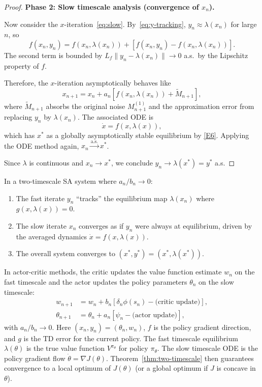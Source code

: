 \documentclass[11pt,a4paper]{article}
\theoremstyle{definition}
\theoremstyle{plain}
\theoremstyle{remark}
\newcommand{\cas}{\xrightarrow{\text{a.s.}}}
\begin{document}
\begin{proof}
\medskip
\noindent\textbf{Phase 2: Slow timescale analysis (convergence of $x_n$).}

Now consider the $x$-iteration~\eqref{eq:slow}. By~\eqref{eq:y-tracking},
$y_n \approx \lambda(x_n)$ for large $n$, so
\[
  f(x_n, y_n) = f(x_n, \lambda(x_n)) + [f(x_n, y_n) - f(x_n, \lambda(x_n))].
\]
The second term is bounded by $L_f \|y_n - \lambda(x_n)\| \to 0$ a.s.\ by
the Lipschitz property of $f$.

Therefore, the $x$-iteration asymptotically behaves like
\[
  x_{n+1} = x_n + a_n [f(x_n, \lambda(x_n)) + \tilde{M}_{n+1}],
\]
where $\tilde{M}_{n+1}$ absorbs the original noise $M_{n+1}^{(1)}$ and the
approximation error from replacing $y_n$ by $\lambda(x_n)$. The associated ODE is
\[
  \dot{x} = f(x, \lambda(x)),
\]
which has $x^*$ as a globally asymptotically stable equilibrium by \ref{E6}.
Applying the ODE method again, $x_n \cas x^*$.

Since $\lambda$ is continuous and $x_n \to x^*$, we conclude
$y_n \to \lambda(x^*) = y^*$ a.s.
\end{proof}

\begin{keyresult}
In a two-timescale SA system where $a_n/b_n \to 0$:
\begin{enumerate}[leftmargin=2em]
\item The fast iterate $y_n$ ``tracks'' the equilibrium map $\lambda(x_n)$ where
  $g(x, \lambda(x)) = 0$.
\item The slow iterate $x_n$ converges as if $y_n$ were always at equilibrium,
  driven by the averaged dynamics $\dot{x} = f(x, \lambda(x))$.
\item The overall system converges to $(x^*, y^*) = (x^*, \lambda(x^*))$.
\end{enumerate}
\end{keyresult}

\begin{rlconnection}
In actor-critic methods, the critic updates the value function estimate $w_n$ on
the fast timescale and the actor updates the policy parameters $\theta_n$ on the
slow timescale:
\begin{align*}
  w_{n+1} &= w_n + b_n [\delta_n \phi(s_n) - \text{(critic update)}], \\
  \theta_{n+1} &= \theta_n + a_n [\psi_n - \text{(actor update)}],
\end{align*}
with $a_n / b_n \to 0$. Here $(x_n, y_n) = (\theta_n, w_n)$, $f$ is the policy
gradient direction, and $g$ is the TD error for the current policy. The fast
timescale equilibrium $\lambda(\theta)$ is the true value function
$V^{\pi_\theta}$ for policy $\pi_\theta$. The slow timescale ODE is the policy
gradient flow $\dot{\theta} = \nabla J(\theta)$. Theorem~\ref{thm:two-timescale}
then guarantees convergence to a local optimum of $J(\theta)$ (or a global optimum
if $J$ is concave in $\theta$).
\end{rlconnection}
\end{document}
